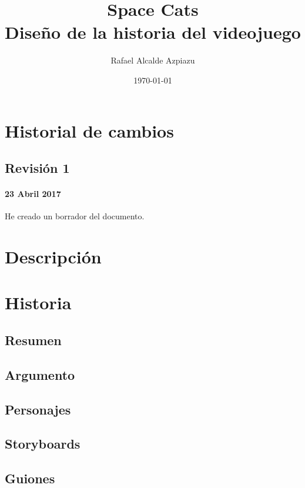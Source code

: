 \documentclass[12pt, spanish, a4paper]{article}
\title{Space Cats \\ Diseño de la historia del videojuego}
\date{\today}
\author{Rafael Alcalde Azpiazu}
\begin{document}
	
	\maketitle
	\newpage
	
	\tableofcontents
	\newpage
	
	
	\section{Historial de cambios}
	
	\subsection{Revisión 1}
	
	\paragraph{23 Abril 2017} He creado un borrador del documento.
	
	\newpage
	
	\section{Descripción}

	\section{Historia}
	
	\lipsum[4]
	
	\subsection{Resumen}
	
	\lipsum[5]
	
	\subsection{Argumento}
	
	\lipsum[6]
	
	\subsection{Personajes}
	
	\lipsum[7]
	
	\subsection{Storyboards}
	
	\lipsum[8]
	
	\subsection{Guiones}
	
	\lipsum[9]
	
	
\end{document}
